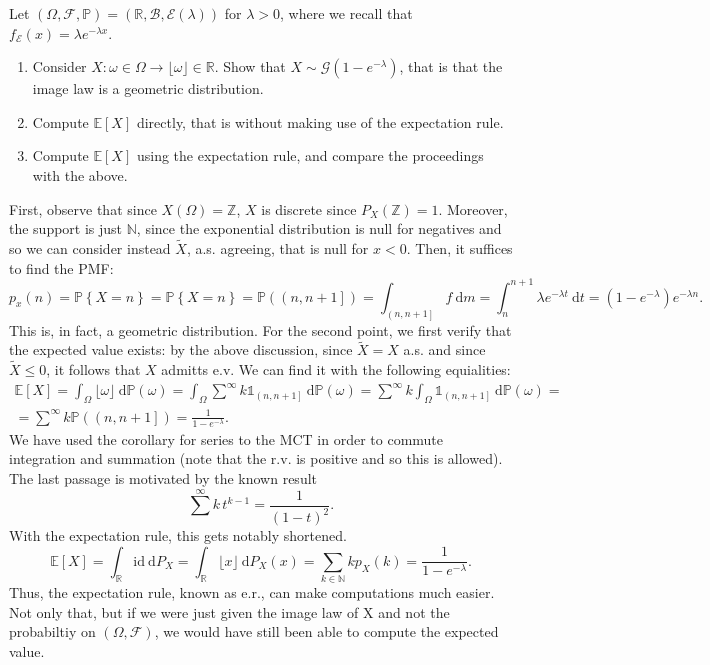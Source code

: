 \begin{my_ex}
	Let $\left( \Omega, \mathcal{F}, \mathbb{P} \right)= \left( \mathbb{R}, \mathcal{B}, \mathcal{E}(\lambda) \right)$ for $\lambda>0$, where we recall that $f_\mathcal{E}(x)=\lambda e^{-\lambda x}$.
	\begin{enumerate}
		\item Consider $X: \omega \in \Omega \to \lfloor \omega \rfloor \in \mathbb{R}$. Show that $X \sim \mathcal{G}(1-e^{-\lambda})$, that is that the image law is a geometric distribution.
		\item Compute $\mathbb{E}[X]$ directly, that is without making use of the expectation rule.
		\item Compute $\mathbb{E}[X]$ using the expectation rule, and compare the proceedings with the above.
	\end{enumerate}
\end{my_ex}
\begin{my_remark}
	First, observe that since $X(\Omega)=\mathbb{Z}$, $X$ is discrete since $P_X(\mathbb{Z})=1$. Moreover, the support is just $\mathbb{N}$, since the exponential distribution is null for negatives and so we can consider instead $\tilde{X}$, a.s. agreeing, that is null for $x<0$. Then, it suffices to find the PMF:
	\begin{equation*}
		p_x(n)=
		\mathbb{P}\left\{X=n\right\}=
		\mathbb{P}\left\{X=n\right\}=
		\mathbb{P}\left( \left( n,n+1 \right] \right)=
		\int_{\left( n,n+1 \right]} f \:\mathrm{d}m=
		\int_{n}^{n+1} \lambda e^{-\lambda t} \:\mathrm{d}t=
		\left( 1 - e^{-\lambda} \right) e^{-\lambda n}.
	\end{equation*}
	This is, in fact, a geometric distribution. For the second point, we first verify that the expected value exists: by the above discussion, since $\tilde{X}=X$ a.s. and since $\tilde{X} \leq 0$, it follows that $X$ admitts e.v. We can find it with the following equialities: 
	\begin{multline*}
		\mathbb{E}[X] = \int_\Omega \lfloor \omega \rfloor \:\mathrm{d}\mathbb{P}(\omega) = \int_\Omega \sum^{\infty} k\mathbb{1}_{\left( n,n+1 \right]} \:\mathrm{d}\mathbb{P}(\omega) = \sum^{\infty} k \int_\Omega \mathbb{1}_{\left( n,n+1 \right]} \:\mathrm{d}\mathbb{P}(\omega) =\\= \sum^{\infty} k \mathbb{P} \left(\left( n,n+1 \right]\right) = \frac{1}{1 - e^{- \lambda}}.
	\end{multline*}
	We have used the corollary for series to the MCT in order to commute integration and summation (note that the r.v. is positive and so this is allowed). The last passage is motivated by the known result
	\[
		\sum^{\infty} k \, t^{k-1} = \frac{1}{(1-t)^2}.	
	\]
	With the expectation rule, this gets notably shortened.
	\[
		\mathbb{E}[X] = \int_\mathbb{R} \mathrm{id} \:\mathrm{d}P_X = \int_\mathbb{R} \lfloor x \rfloor \:\mathrm{d}P_X(x) = \sum_{k\in\mathbb{N}} k p_X(k) = \frac{1}{1 - e^{- \lambda}}.
	\]
	Thus, the expectation rule, known as e.r., can make computations much easier. Not only that, but if we were just given the image law of X and not the probabiltiy on $\left(\Omega,\mathcal{F}\right)$, we would have still been able to compute the expected value.
\end{my_remark}

